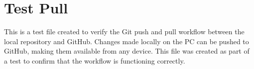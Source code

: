 \chapter{Test Pull}
\label{app:test_pull}
\fancyhead{}

This is a test file created to verify the Git push and pull workflow between the local repository and GitHub.
Changes made locally on the PC can be pushed to GitHub, making them available from any device.
This file was created as part of a test to confirm that the workflow is functioning correctly.
